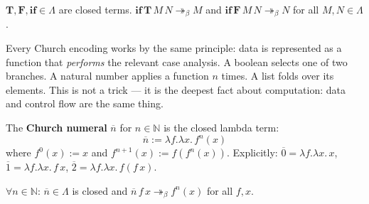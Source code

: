 \begin{remark*}
$\mathbf{T}, \mathbf{F}, \mathbf{if} \in \Lambda$ are closed terms.
$\mathbf{if}\,\mathbf{T}\,M\,N \twoheadrightarrow_\beta M$ and
$\mathbf{if}\,\mathbf{F}\,M\,N \twoheadrightarrow_\beta N$
for all $M,N\in\Lambda$.
\end{remark*}

\begin{remark*}[Flash]
\end{remark*}

\begin{remark*}[Intuition]
Every Church encoding works by the same principle: data is represented
as a function that \emph{performs} the relevant case analysis.  A boolean
selects one of two branches.  A natural number applies a function $n$
times.  A list folds over its elements.  This is not a trick --- it is
the deepest fact about computation: data and control flow are the same thing.
\end{remark*}

\begin{tcolorbox}[colback=propbox, colframe=propborder, arc=2pt,
  left=6pt, right=6pt, top=4pt, bottom=4pt,
  title={\small\textbf{Definition (Church Numerals)}},
  fonttitle=\small\bfseries]
\label{def:church-numerals}
The \textbf{Church numeral} $\overline{n}$ for $n \in \mathbb{N}$
is the closed lambda term:
\[
  \overline{n} := \lambda f.\lambda x.\,f^n(x)
\]
where $f^0(x) := x$ and $f^{n+1}(x) := f(f^n(x))$.
Explicitly: $\overline{0} = \lambda f.\lambda x.\,x$,\quad
$\overline{1} = \lambda f.\lambda x.\,f\,x$,\quad
$\overline{2} = \lambda f.\lambda x.\,f(f\,x)$.
\end{tcolorbox}

\begin{remark*}
$\forall n\in\mathbb{N}$: $\overline{n}\in\Lambda$ is closed and
$\overline{n}\,f\,x \twoheadrightarrow_\beta f^n(x)$ for all $f,x$.
\end{remark*}

